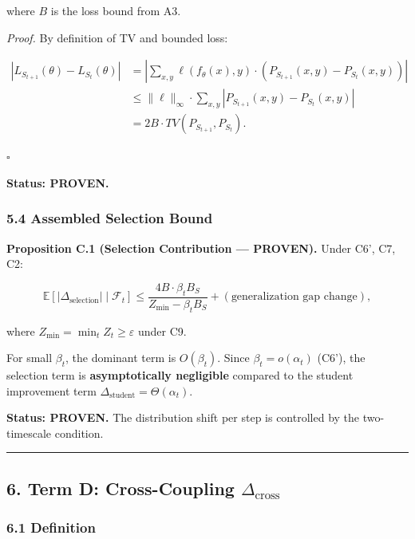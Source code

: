 \documentclass[
  12pt,
]{ctexart}
\begin{document}
where \(B\) is the loss bound from A3.

\emph{Proof.} By definition of TV and bounded loss:

\[\begin{aligned}
|L_{S_{t+1}}(\theta) - L_{S_t}(\theta)| &= \left|\sum_{x,y} \ell(f_\theta(x), y) \cdot (P_{S_{t+1}}(x,y) - P_{S_t}(x,y))\right| \\
&\leq \|\ell\|_\infty \cdot \sum_{x,y} |P_{S_{t+1}}(x,y) - P_{S_t}(x,y)| \\
&= 2B \cdot TV(P_{S_{t+1}}, P_{S_t}).
\end{aligned}\]

\(\square\)

\textbf{Status: PROVEN.}

\subsubsection{5.4 Assembled Selection
Bound}\label{assembled-selection-bound}

\textbf{Proposition C.1 (Selection Contribution --- PROVEN).} Under C6',
C7, C2:

\[\mathbb{E}[|\Delta_{\text{selection}}| \mid \mathcal{F}_t] \leq \frac{4B \cdot \beta_t B_S}{Z_{\min} - \beta_t B_S} + (\text{generalization gap change}),\]

where \(Z_{\min} = \min_t Z_t \geq \varepsilon\) under C9.

For small \(\beta_t\), the dominant term is \(O(\beta_t)\). Since
\(\beta_t = o(\alpha_t)\) (C6'), the selection term is
\textbf{asymptotically negligible} compared to the student improvement
term \(\Delta_{\text{student}} = \Theta(\alpha_t)\).

\textbf{Status: PROVEN.} The distribution shift per step is controlled
by the two-timescale condition.

\begin{center}\rule{0.5\linewidth}{0.5pt}\end{center}

\subsection{\texorpdfstring{6. Term D: Cross-Coupling
\(\Delta_{\text{cross}}\)}{6. Term D: Cross-Coupling \textbackslash Delta\_\{\textbackslash text\{cross\}\}}}\label{term-d-cross-coupling-delta_textcross}

\subsubsection{6.1 Definition}\label{definition-1}
\end{document}
